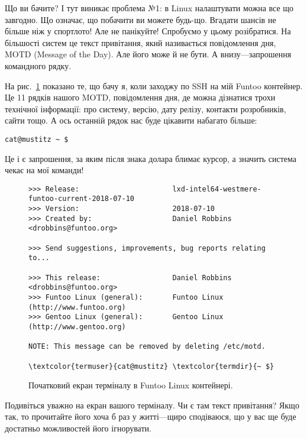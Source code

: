 Що ви бачите?
І тут виникає проблема №1: в Linux налаштувати можна все що завгодно.
Що означає, що побачити ви можете будь-що.
Вгадати шансів не більше ніж у спортлото!
Але не панікуйте!
Спробуємо у цьому розібратися.
На більшості систем це текст привітання, який називається повідомлення дня, MOTD (Message of the Day).
Але його може й не бути.
А внизу---запрошення командного рядку.

На рис.~\ref{Terminal_Greeting} показано те, що бачу я, коли заходжу по SSH на мій Funtoo контейнер.
Це 11 рядків нашого MOTD, повідомлення дня, де можна дізнатися трохи технічної інформації:
про систему, версію, дату релізу, контакти розробників, сайти тощо.
А ось останній рядок нас буде цікавити набагато більше:

\texttt{\textcolor{termuser}{cat@mustitz}~\textcolor{termdir}{\textasciitilde~\$}}

Це і є запрошення, за яким після знака долара блимає курсор, а значить система чекає на мої команди!

\begin{figure}[tb]
 \centering
 \begin{Verbatim}[fontsize=\footnotesize,frame=single,commandchars=\\\{\}]
>>> Release:                      lxd-intel64-westmere-funtoo-current-2018-07-10
>>> Version:                      2018-07-10
>>> Created by:                   Daniel Robbins <drobbins@funtoo.org>

>>> Send suggestions, improvements, bug reports relating to...

>>> This release:                 Daniel Robbins <drobbins@funtoo.org>
>>> Funtoo Linux (general):       Funtoo Linux (http://www.funtoo.org)
>>> Gentoo Linux (general):       Gentoo Linux (http://www.gentoo.org)

NOTE: This message can be removed by deleting /etc/motd.

\textcolor{termuser}{cat@mustitz} \textcolor{termdir}{~ $}
 \end{Verbatim}
 \caption{Початковий екран терміналу в Funtoo Linux контейнері.}
 \label{Terminal_Greeting}
\end{figure}

\begin{exercise}
Подивіться уважно на екран вашого терміналу.
Чи є там текст привітання?
Якщо так, то прочитайте його хоча б раз у житті---щиро сподіваюся,
що у вас ще буде достатньо можливостей його ігнорувати.
\end{exercise}

